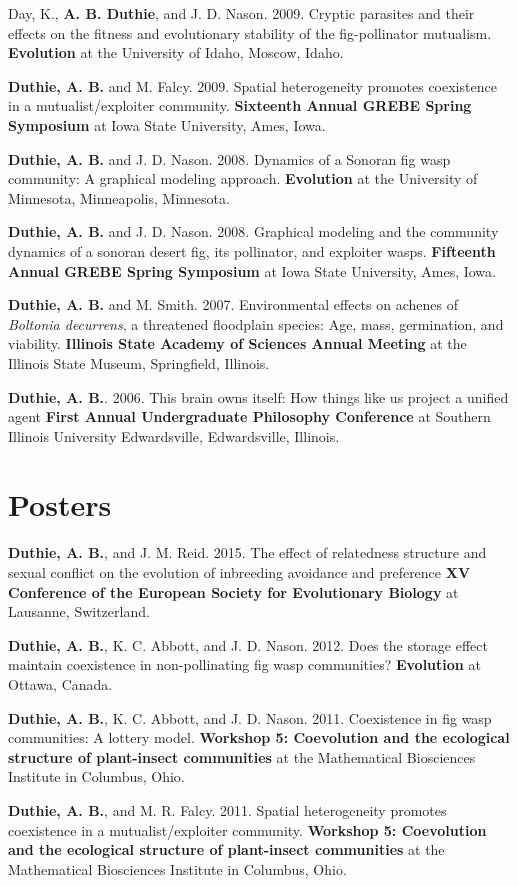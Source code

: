 \documentclass[letterpaper]{article}
\renewenvironment{itemize}{
  \begin{list}{}{
    \setlength{\leftmargin}{1.5em}
  }
}{
  \end{list}
}
\begin{document}
\begin{itemize}
\item Day, K., {\bf A. B. Duthie}, and J. D. Nason. 2009. Cryptic parasites and their effects on the fitness and evolutionary stability of the fig-pollinator mutualism. {\bf Evolution} at the University of Idaho, Moscow, Idaho.
\item {\bf Duthie, A. B.} and M. Falcy. 2009. Spatial heterogeneity promotes coexistence in a mutualist/exploiter community. {\bf Sixteenth Annual GREBE Spring Symposium} at Iowa State University, Ames, Iowa.
\item {\bf Duthie, A. B.} and J. D. Nason. 2008. Dynamics of a Sonoran fig wasp community: A graphical modeling approach. {\bf Evolution} at the University of Minnesota, Minneapolis, Minnesota.
\item {\bf Duthie, A. B.} and J. D. Nason. 2008. Graphical modeling and the community dynamics of a sonoran desert fig, its pollinator, and exploiter wasps. {\bf Fifteenth Annual GREBE Spring Symposium} at Iowa State University, Ames, Iowa.
\item {\bf Duthie, A. B.} and M. Smith. 2007. Environmental effects on achenes of {\it Boltonia decurrens}, a threatened floodplain species: Age, mass, germination, and viability. {\bf Illinois State Academy of Sciences Annual Meeting} at the Illinois State Museum, Springfield, Illinois.
\item {\bf Duthie, A. B.}. 2006. This brain owns itself: How things like us project a unified agent {\bf First Annual Undergraduate Philosophy Conference} at Southern Illinois University Edwardsville, Edwardsville, Illinois.
\end{itemize}

\section*{Posters}
\begin{itemize}
\item {\bf Duthie, A. B.}, and J. M. Reid. 2015. The effect of relatedness structure and sexual conflict on the evolution of inbreeding avoidance and preference {\bf XV Conference of the European Society for Evolutionary Biology} at Lausanne, Switzerland.
\item {\bf Duthie, A. B.}, K. C. Abbott, and J. D. Nason. 2012. Does the storage effect maintain coexistence in non-pollinating fig wasp communities? {\bf Evolution} at Ottawa, Canada.
\item {\bf Duthie, A. B.}, K. C. Abbott, and J. D. Nason. 2011. Coexistence in fig wasp communities: A lottery model. {\bf Workshop 5: Coevolution and the ecological structure of plant-insect communities} at the Mathematical Biosciences Institute in Columbus, Ohio.
\item {\bf Duthie, A. B.}, and M. R. Falcy. 2011. Spatial heterogeneity promotes coexistence in a mutualist/exploiter community. {\bf Workshop 5: Coevolution and the ecological structure of plant-insect communities} at the Mathematical Biosciences Institute in Columbus, Ohio.
\end{itemize}
\end{document}
